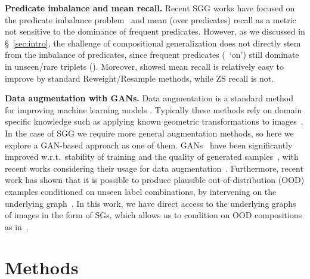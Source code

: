 \textbf{Predicate imbalance and mean recall.}
Recent SGG works have focused on the predicate imbalance problem~\citep{chen2019knowledge, dornadula2019visual,tang2019learning,zhang2019graphical,tang2020unbiased,chen2019scene,zareian2020bridging,lin2020gps,zareian2020learning,yan2020pcpl} and mean (over predicates) recall as a metric not sensitive to the dominance of frequent predicates. However, as we discussed in \S~\ref{sec:intro}, the challenge of compositional generalization does not directly stem from the imbalance of predicates, since frequent predicates (\eg~`on') still dominate in unseen/rare triplets (\fig{\ref{fig:predicates}}).
Moreover, \citep{tang2020unbiased} showed mean recall is relatively easy to improve by standard Reweight/Resample methods, while ZS recall is not.

\textbf{Data augmentation with GANs.} Data augmentation is a standard method for improving machine learning models \citep{ratner2017learning}. Typically these methods rely on domain specific knowledge such as applying known geometric transformations to images~\citep{devries2017improved,cubuk2018autoaugment}. 
In the case of SGG we require more general augmentation methods, so here we explore a GAN-based approach as one of them.
GANs~\citep{goodfellow2014generative} have been significantly improved w.r.t.~stability of training and the quality of generated samples~\citep{brock2018large,karras2020training}, with recent works considering their usage for data augmentation~\citep{ravuri2019seeing,shin2018medical, sandfort2019data}. Furthermore, recent work has shown that it is possible to produce plausible out-of-distribution (OOD) examples conditioned on unseen label combinations, by intervening on the underlying graph~\citep{kocaoglu2017causalgan,casanova2020generating,sun2020learning,deng2021generative,greff2019multi}. In this work, we have direct access to the underlying graphs of images in the form of SGs, which allows us to condition on OOD compositions as in~\citep{casanova2020generating,deng2021generative}.


\section{Methods}\label{sec:iccv_methods}
\vspace{-5pt}


